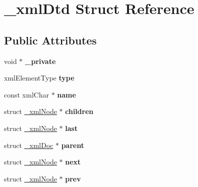 \hypertarget{struct__xmlDtd}{
\section{\_\-xmlDtd Struct Reference}
\label{struct__xmlDtd}
}
\subsection*{Public Attributes}
\begin{DoxyCompactItemize}
\item 
\hypertarget{struct__xmlDtd_a61a1038a006bf0e6a5419c8c7ba31650}{
void $\ast$ {\bfseries \_\-private}}
\label{struct__xmlDtd_a61a1038a006bf0e6a5419c8c7ba31650}

\item 
\hypertarget{struct__xmlDtd_a823418c1633bafc9bb653ddb4228bb1b}{
xmlElementType {\bfseries type}}
\label{struct__xmlDtd_a823418c1633bafc9bb653ddb4228bb1b}

\item 
\hypertarget{struct__xmlDtd_a956c542a2f8f36eca0d1ca732de4ffa1}{
const xmlChar $\ast$ {\bfseries name}}
\label{struct__xmlDtd_a956c542a2f8f36eca0d1ca732de4ffa1}

\item 
\hypertarget{struct__xmlDtd_ad21db7d7c006d6f5b677cbc186794c92}{
struct \hyperlink{struct__xmlNode}{\_\-xmlNode} $\ast$ {\bfseries children}}
\label{struct__xmlDtd_ad21db7d7c006d6f5b677cbc186794c92}

\item 
\hypertarget{struct__xmlDtd_a987026be4bdc222950867088b9a773f3}{
struct \hyperlink{struct__xmlNode}{\_\-xmlNode} $\ast$ {\bfseries last}}
\label{struct__xmlDtd_a987026be4bdc222950867088b9a773f3}

\item 
\hypertarget{struct__xmlDtd_ae24fc717f1eea8d7de73adddc1ea9d98}{
struct \hyperlink{struct__xmlDoc}{\_\-xmlDoc} $\ast$ {\bfseries parent}}
\label{struct__xmlDtd_ae24fc717f1eea8d7de73adddc1ea9d98}

\item 
\hypertarget{struct__xmlDtd_a7a71339012cb16a7808dc669202434f6}{
struct \hyperlink{struct__xmlNode}{\_\-xmlNode} $\ast$ {\bfseries next}}
\label{struct__xmlDtd_a7a71339012cb16a7808dc669202434f6}

\item 
\hypertarget{struct__xmlDtd_a22a38c614122e7ec48b593de6b7e7d03}{
struct \hyperlink{struct__xmlNode}{\_\-xmlNode} $\ast$ {\bfseries prev}}
\label{struct__xmlDtd_a22a38c614122e7ec48b593de6b7e7d03}


\end{DoxyCompactItemize}
